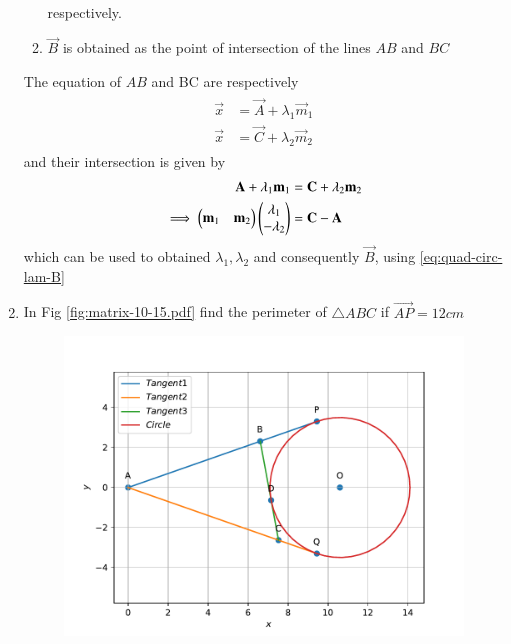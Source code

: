 \documentclass[journal,12pt,twocolumn]{IEEEtran}
\renewcommand\thesection{\arabic{section}}
\begin{document}
\begin{enumerate}[label=\thesection.\arabic*.,ref=\thesection.\theenumi]
\begin{enumerate}
\begin{align}
		\end{align}
		respectively.
	\item $\vec{B}$ is obtained as the point of intersection of the lines $AB$ and $BC$
\end{enumerate}
The equation of $AB$ and BC are respectively 
\begin{align}
	\begin{split}
	\vec{x} &= \vec{A} + \lambda_1 \vec{m}_1
\\
		\vec{x} &= \vec{C} + \lambda_2 \vec{m}_2
		\label{eq:quad-circ-lam-B}
	\end{split}
\end{align}
and their intersection is given by 
\begin{align}
	 \mathbf{A} + \lambda_1 \mathbf{m}_1
	&	= \mathbf{C} + \lambda_2 \mathbf{m}_2
	\\
	\implies \begin{pmatrix}\mathbf{m}_1 & \mathbf{m}_2\end{pmatrix}\begin{pmatrix}\lambda_1 \\ -\lambda_2 \end{pmatrix} &= \mathbf{C}-\mathbf{A}
\end{align}
which can be used to obtained $\lambda_1, \lambda_2$ and consequently $\vec{B}$, using 
		\eqref{eq:quad-circ-lam-B}
\begin{table}[ht!]
	
\caption{}
\label{table:circ-tang}	
\end{table}
     \item In Fig 
	  \ref{fig:matrix-10-15.pdf}
find the perimeter of $\triangle ABC$ if $\vec{AP} = 12cm$\\
  \begin{figure}
	  \centering 
	  \includegraphics[width=\columnwidth]{figs/matrix-10-15.pdf}

\end{figure}
\end{enumerate}
\end{document}
